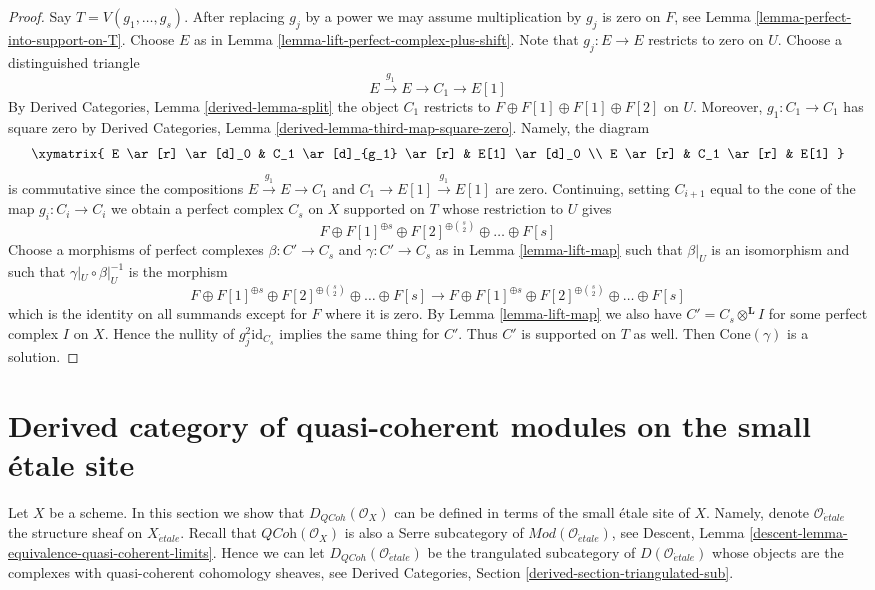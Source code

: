 \begin{proof}
Say $T = V(g_1, \ldots, g_s)$. After replacing $g_j$ by a power we
may assume multiplication by $g_j$ is zero on $F$, see
Lemma \ref{lemma-perfect-into-support-on-T}. Choose $E$ as in
Lemma \ref{lemma-lift-perfect-complex-plus-shift}.
Note that $g_j : E \to E$ restricts to zero on $U$.
Choose a distinguished triangle
$$
E \xrightarrow{g_1} E \to C_1 \to E[1]
$$
By Derived Categories, Lemma \ref{derived-lemma-split}
the object $C_1$ restricts to
$F \oplus F[1] \oplus F[1] \oplus F[2]$ on $U$.
Moreover, $g_1 : C_1 \to C_1$ has square zero by
Derived Categories, Lemma \ref{derived-lemma-third-map-square-zero}.
Namely, the diagram
$$
\xymatrix{
E \ar[r] \ar[d]_0 & C_1 \ar[d]_{g_1} \ar[r] & E[1] \ar[d]_0 \\
E \ar[r] & C_1 \ar[r] & E[1]
}
$$
is commutative since the compositions $E \xrightarrow{g_1} E \to C_1$ and
$C_1 \to E[1] \xrightarrow{g_1} E[1]$ are zero. Continuing, setting
$C_{i + 1}$ equal to the cone of the map $g_i : C_i \to C_i$ we obtain
a perfect complex $C_s$ on $X$ supported on $T$
whose restriction to $U$ gives
$$
F \oplus F[1]^{\oplus s} \oplus F[2]^{\oplus {s \choose 2}}
\oplus \ldots \oplus F[s]
$$
Choose a morphisms of perfect complexes $\beta : C' \to C_s$
and $\gamma : C' \to C_s$ as in Lemma \ref{lemma-lift-map}
such that $\beta|_U$ is an isomorphism and such that
$\gamma|_U \circ \beta|_U^{-1}$ is the morphism
$$
F \oplus F[1]^{\oplus s} \oplus F[2]^{\oplus {s \choose 2}}
\oplus \ldots \oplus F[s]
\to
F \oplus F[1]^{\oplus s} \oplus F[2]^{\oplus {s \choose 2}}
\oplus \ldots \oplus F[s]
$$
which is the identity on all summands except for $F$ where it is zero.
By Lemma \ref{lemma-lift-map} we also have
$C' = C_s \otimes^\mathbf{L} I$ for some perfect complex
$I$ on $X$. Hence the nullity of $g_j^2\text{id}_{C_s}$ implies the
same thing for $C'$. Thus $C'$ is supported on $T$ as well.
Then $\text{Cone}(\gamma)$ is a solution.
\end{proof}





\section{Derived category of quasi-coherent modules on the small \'etale site}
\label{section-derived-quasi-coherent-etale}

\noindent
Let $X$ be a scheme.
In this section we show that $D_{QCoh}(\mathcal{O}_X)$ can be defined in terms
of the small \'etale site of $X$. Namely, denote $\mathcal{O}_{\acute{e}tale}$
the structure sheaf on $X_{\acute{e}tale}$. Recall that
$\textit{QCoh}(\mathcal{O}_X)$ is also a Serre subcategory of
$\textit{Mod}(\mathcal{O}_{\acute{e}tale})$, see
Descent, Lemma \ref{descent-lemma-equivalence-quasi-coherent-limits}.
Hence we can let $D_{QCoh}(\mathcal{O}_{\acute{e}tale})$ be the trangulated
subcategory of $D(\mathcal{O}_{\acute{e}tale})$ whose objects are the
complexes with quasi-coherent cohomology sheaves, see
Derived Categories, Section \ref{derived-section-triangulated-sub}.

